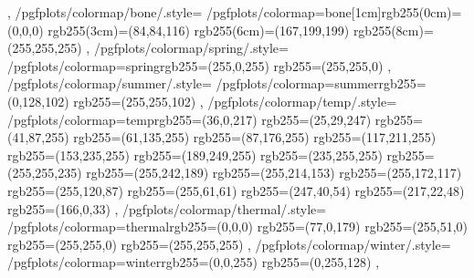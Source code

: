 {{ 	},
	/pgfplots/colormap/bone/.style={
		/pgfplots/colormap={bone}{[1cm]rgb255(0cm)=(0,0,0) rgb255(3cm)=(84,84,116) rgb255(6cm)=(167,199,199) rgb255(8cm)=(255,255,255)}
},
 	/pgfplots/colormap/spring/.style={
 		/pgfplots/colormap={spring}{rgb255=(255,0,255) rgb255=(255,255,0)}
 	},
 	/pgfplots/colormap/summer/.style={
 		/pgfplots/colormap={summer}{rgb255=(0,128,102) rgb255=(255,255,102)}
 	},
 	/pgfplots/colormap/temp/.style={
 		/pgfplots/colormap={temp}{rgb255=(36,0,217) rgb255=(25,29,247) rgb255=(41,87,255) rgb255=(61,135,255) rgb255=(87,176,255) rgb255=(117,211,255) rgb255=(153,235,255) rgb255=(189,249,255) rgb255=(235,255,255) rgb255=(255,255,235) rgb255=(255,242,189) rgb255=(255,214,153) rgb255=(255,172,117) rgb255=(255,120,87) rgb255=(255,61,61) rgb255=(247,40,54) rgb255=(217,22,48) rgb255=(166,0,33)}
 	},
 	/pgfplots/colormap/thermal/.style={
 		/pgfplots/colormap={thermal}{rgb255=(0,0,0) rgb255=(77,0,179) rgb255=(255,51,0) rgb255=(255,255,0) rgb255=(255,255,255)}
	},
 	/pgfplots/colormap/winter/.style={
 		/pgfplots/colormap={winter}{rgb255=(0,0,255) rgb255=(0,255,128)}
 	},
}

\endinput
